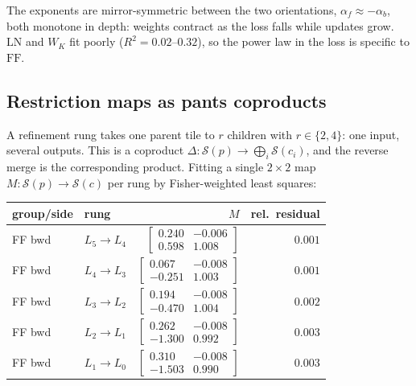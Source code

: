 The exponents are mirror-symmetric between the two orientations, $\alpha_f
\approx -\alpha_b$, both monotone in depth: weights contract as the loss falls
while updates grow. $\mathrm{LN}$ and $W_K$ fit poorly ($R^2 = 0.02$--$0.32$),
so the power law in the loss is specific to $\mathrm{FF}$.

\subsection{Restriction maps as pants coproducts}

A refinement rung takes one parent tile to $r$ children with $r \in \{2,4\}$:
one input, several outputs. This is a coproduct
$\Delta : \mathcal{S}(p) \to \bigoplus_{i}\mathcal{S}(c_i)$, and the reverse
merge is the corresponding product. Fitting a single $2\times2$ map
$M : \mathcal{S}(p) \to \mathcal{S}(c)$ per rung by Fisher-weighted least
squares:

\begin{center}
\begin{tabular}{llrr}
\toprule
group/side & rung & $M$ & rel.\ residual \\
\midrule
FF bwd & $L_5\!\to\!L_4$ & $\left[\begin{smallmatrix}0.240 & -0.006\\ 0.598 & 1.008\end{smallmatrix}\right]$ & $0.001$ \\
FF bwd & $L_4\!\to\!L_3$ & $\left[\begin{smallmatrix}0.067 & -0.008\\ -0.251 & 1.003\end{smallmatrix}\right]$ & $0.001$ \\
FF bwd & $L_3\!\to\!L_2$ & $\left[\begin{smallmatrix}0.194 & -0.008\\ -0.470 & 1.004\end{smallmatrix}\right]$ & $0.002$ \\
FF bwd & $L_2\!\to\!L_1$ & $\left[\begin{smallmatrix}0.262 & -0.008\\ -1.300 & 0.992\end{smallmatrix}\right]$ & $0.003$ \\
FF bwd & $L_1\!\to\!L_0$ & $\left[\begin{smallmatrix}0.310 & -0.008\\ -1.503 & 0.990\end{smallmatrix}\right]$ & $0.003$ \\
\bottomrule
\end{tabular}
\end{center}

